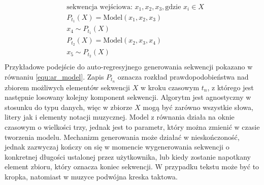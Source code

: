 \documentclass[data-science]{agh-wi} %
\begin{document}
\begin{equation}
    \begin{aligned}
         & \text{sekwencja wejściowa: } x_1, x_2, x_3, \text{gdzie } x_i \in X \\
         & P_{t_1}(X) = \text{Model}(x_1, x_2, x_3)                            \\
         & x_4 \sim P_{t_1}(X)                                                 \\
         & P_{t_2}(X) = \text{Model}(x_2, x_3, x_4)                            \\
         & x_5 \sim P_{t_2}(X)                                                 \\
    \end{aligned}
    \label{equ:ar_model}
\end{equation}
Przykładowe podejście do auto-regresyjnego generowania sekwencji pokazano w równaniu \ref*{equ:ar_model}. Zapis $P_{t_n}$ oznacza rozkład prawdopodobieństwa nad zbiorem możliwych elementów sekwencji $X$ w kroku czasowym $t_n$, z którego jest następnie losowany kolejny komponent sekwencji. Algorytm jest agnostyczny w stosunku do typu danych, więc w zbiorze $X$ mogą być zarówno wszystkie słowa, litery jak i elementy notacji muzycznej. Model z równania działa na oknie czasowym o wielkości trzy, jednak jest to parametr, który można zmienić w czasie tworzenia modelu. Mechanizm generowania może działać w nieskończoność, jednak zazwyczaj kończy on się w momencie wygenerowania sekwencji o konkretnej długości ustalonej przez użytkownika, lub kiedy zostanie napotkany element zbioru, który oznacza koniec sekwencji. W przypadku tekstu może być to kropka, natomiast w muzyce podwójna kreska taktowa.
\end{document}
